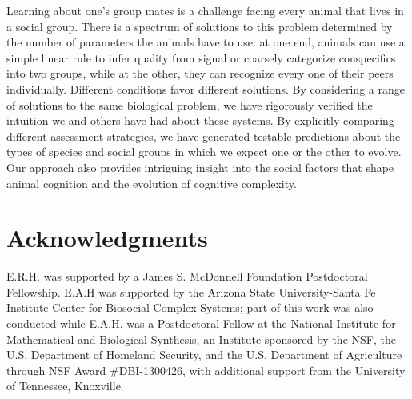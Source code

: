 Learning about one's group mates is a challenge facing every animal that lives in a social group. There is a spectrum of solutions to this problem determined by the number of parameters the animals have to use: at one end, animals can use a simple linear rule to infer quality from signal or coarsely categorize conspecifics into two groups, while at the other, they can recognize every one of their peers individually.
Different conditions favor different solutions. By considering a range of solutions to the same biological problem, we have rigorously verified the intuition we and others have had about these systems. By explicitly comparing different assessment strategies, we have generated testable predictions about the types of species and social groups in which we expect one or the other to evolve. Our approach also provides intriguing insight into the social factors that shape animal cognition and the evolution of cognitive complexity. 

\section*{Acknowledgments} E.R.H. was supported by a James S. McDonnell Foundation Postdoctoral Fellowship. E.A.H was supported by the Arizona State University-Santa Fe Institute Center for Biosocial Complex Systems; part of this work was also conducted while E.A.H. was a Postdoctoral Fellow at the National Institute for Mathematical and Biological Synthesis, an Institute sponsored by the NSF, the U.S. Department of Homeland Security, and the U.S. Department of Agriculture through NSF Award \#DBI-1300426, with additional support from the University of Tennessee, Knoxville.

\newpage



\newpage

